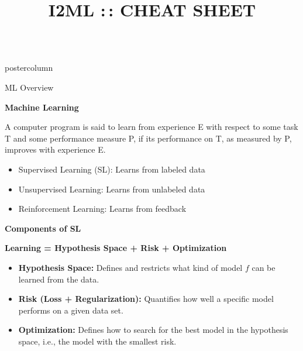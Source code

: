 \documentclass{beamer}
\title{I2ML :\,: CHEAT SHEET} %
\begin{document}
\begin{frame}[fragile]{}
\begin{columns}
	\begin{column}{.31\textwidth}
		\begin{beamercolorbox}[center]{postercolumn}
			\begin{minipage}{.98\textwidth}
				\parbox[t][\columnheight]{\textwidth}{

					\begin{myblock}{ML Overview}

						\begin{codebox}
							\textbf{Machine Learning}
						\end{codebox}
            A computer program is said to learn from experience E with respect to some task T and some performance measure P, 
            if its performance on T, as measured by P, improves with experience E.
            \begin{itemize}[$\bullet$] 
              \setlength{\itemindent}{+.3in}
                          \item Supervised Learning (SL): Learns from labeled data
                          \item Unsupervised Learning: Learns from unlabeled data
                          \item Reinforcement Learning: Learns from feedback
                         \end{itemize}

              \begin{codebox}
                \textbf{Components of SL}
              \end{codebox}
              \textbf{Learning = Hypothesis Space + Risk + Optimization}
              \begin{itemize}[$\bullet$] 
                \setlength{\itemindent}{+.3in}
                \item \textbf{Hypothesis Space:} Defines and restricts what kind of model 
                $f$ can be learned from the data.
                \item \textbf{Risk (Loss + Regularization):} Quantifies how well a specific model performs on a given 
                data set.
                \item \textbf{Optimization:} Defines how to search for the best model in the 
                hypothesis space, i.e., the model with the smallest risk.
              \end{itemize}

\end{myblock}


}
\end{minipage}
\end{beamercolorbox}
\end{column}
\end{columns}
\end{frame}
\end{document}
